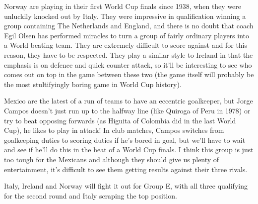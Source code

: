 Norway are playing in their first World Cup finals since 1938, when they were
unluckily knocked out by Italy. They were impressive in qualification winning
a group containing The Netherlands and England, and there is no doubt that
coach Egil Olsen has performed miracles to turn a group of fairly ordinary 
players into a World beating team. They are extremely difficult to score 
against and for this reason, they have to be respected. They play a similar
style to Ireland in that the emphasis is on defence and quick counter attack, 
so it'll be interesting to see who comes out on top in the game between these
two (the game itself will probably be the most stultifyingly boring game in
World Cup history).

Mexico are the latest of a run of teams to have an eccentric goalkeeper, but 
Jorge Campos doesn't just run up to the halfway line (like Quiroga of Peru in 
1978) or try to beat opposing forwards (as Higuita of Colombia did in the last
World Cup), he likes to play in attack! In club matches, Campos switches from
goalkeeping duties to scoring duties if he's bored in goal, but we'll have to
wait and see if he'll do this in the heat of a World Cup finals. I think this
group is just too tough for the Mexicans and although they should give us 
plenty of entertainment, it's difficult to see them getting results against 
their three rivals.

Italy, Ireland and Norway will fight it out for Group E, with all three 
qualifying for the second round and Italy scraping the top position.
